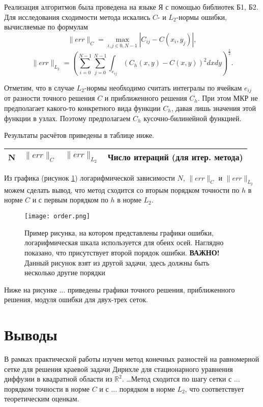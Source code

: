 \documentclass[a4paper, 11pt]{article}
\begin{document}
Реализация алгоритмов была проведена на языке Я с помощью библиотек Б1, Б2. Для исследования сходимости метода искались $C$- и $L_2$-нормы ошибки, вычисляемые по формулам
$$\|err\|_C = \max_{i, j \in \overline{0, N - 1}} \left| C_{ij} - C(x_i, y_j)\right|,$$
$$\|err\|_{L_2} = \left( \sum_{i = 0}^{N - 1}\sum_{j = 0}^{N - 1} \int_{e_{ij}} (C_h(x,y) - C(x, y))^2 dxdy \right)^{\frac{1}{2}}.$$

Отметим, что в случае $L_2$-нормы необходимо считать интегралы по ячейкам $e_{ij}$ от разности точного решения $C$ и приближенного решения $C_h$. При этом МКР не предполагает какого-то конкретного вида функции $C_h$, давая лишь значения этой функции в узлах. Поэтому предполагаем $C_h$ кусочно-билинейной функцией.

Результаты расчётов приведены в таблице ниже.
\begin{center}
	\begin{tabular}{ | c | l | l | c | }
		\hline
		N & $\|err\|_C$ & $\|err\|_{L_2}$ & Число итераций (для итер. метода) \\ \hline
	\end{tabular}
\end{center}

Из графика (рисунок \ref{fig:order}) логарифмической зависимости $N$, $\|err\|_C$ и $\|err\|_{L_2}$ можем сделать вывод, что метод сходится со вторым порядком точности по $h$ в норме $C$ и с первым порядком по $h$ в норме $L_2$.

\begin{figure}[h] \centering
	\texttt{[image: order.png]}
	\caption{Пример рисунка, на котором представлены графики ошибки, логарифмическая шкала используется для обеих осей. Наглядно показано, что присутствует второй порядок ошибки. \textbf{ВАЖНО!} Данный рисунок взят из другой задачи, здесь должны быть несколько другие порядки\label{fig:order}}
\end{figure}

Ниже на рисунке ... приведены графики точного решения, приближенного решения, модуля ошибки для двух-трех сеток.


\section{Выводы}

В рамках практической работы изучен метод конечных разностей на равномерной сетке для решения краевой задачи Дирихле для стационарного уравнения диффузии в квадратной области из $\mathbb{R}^2$. \dots Метод сходится по шагу сетки с ... порядком точности в норме $C$ и с ... порядком в норме $L_2$, что соответствует теоретическим оценкам.
\end{document}
